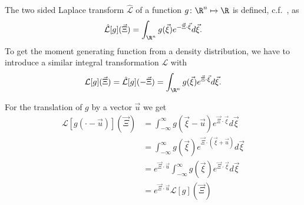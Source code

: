 
The two sided Laplace transform $\mathcal{\hat{L}}$ of a function $g\colon \R^n \mapsto \R$ is defined, c.f.~\cite{weissteinLaplace}, as
\begin{equation}
  \label{eq: Definition of Laplace}
  \mathcal{\hat{L}}[g](\vec{\Xi}) = \int_{\R^n} g(\vec{\xi}) e^{-\vec{\Xi} \cdot \vec{\xi}}d\vec{\xi}.
\end{equation}
To get the moment generating function from a density distribution, we have to introduce a similar integral transformation $\mathcal{L}$ with
\begin{equation}
  \label{eq: Definition of integral transformation}
  \mathcal{L}[g](\vec{\Xi}) = \mathcal{\hat{L}}[g](-\vec{\Xi}) = \int_{\R^n} g(\vec{\xi}) e^{\vec{\Xi} \cdot \vec{\xi}}d\vec{\xi}.
\end{equation}

For the translation of $g$ by a vector $\vec{u}$ we get
\begin{equation}
  \label{eq: translated integral}
  \begin{aligned}
    \mathcal{L}[g(\cdot - \vec{u})](\vec{\Xi})
    & = \int_{-\infty}^\infty g(\vec{\xi}-\vec{u}) e^{\vec{\Xi} \cdot \vec{\xi}}d\vec{\xi} \\
    & = \int_{-\infty}^\infty g(\vec{\xi}) e^{\vec{\Xi} \cdot (\vec{\xi}+\vec{u})}d\vec{\xi} \\
    & =  e^{\vec{\Xi} \cdot \vec{u}} \int_{-\infty}^\infty g(\vec{\xi}) e^{\vec{\Xi} \cdot \vec{\xi}}d\vec{\xi} \\
    & =  e^{\vec{\Xi} \cdot \vec{u}} \mathcal{L}[g](\vec{\Xi})
  \end{aligned}
\end{equation}
